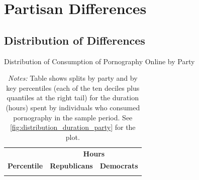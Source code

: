 \documentclass[12pt, letterpaper]{article}
\begin{document}
\section{Partisan Differences}
\subsection{Distribution of Differences}
\begin{table}[ht] \centering \small \setlength\tabcolsep{10 pt}
	\caption{Distribution of Consumption of Pornography Online by Party}
	\label{tab:distribution_duration_party}
	\begin{adjustbox}{max width=\textwidth}
		\begin{tabular}{crr}
			\toprule
			\multicolumn{1}{l}{\textbf{}}&\multicolumn{2}{c}{\textbf{Hours}}\\
			\cmidrule(l){2-3}
			\multicolumn{1}{l}{\textbf{Percentile}}&\multicolumn{1}{c}{\textbf{Republicans}}&\multicolumn{1}{c}{\textbf{Democrats}}\\
			\midrule
			\\
			\bottomrule
		\end{tabular}
	\end{adjustbox}
	\caption*{\footnotesize \emph{Notes:} 
		Table shows splits by party and by key percentiles (each of the ten deciles plus quantiles at the right tail) for the duration (hours) spent by individuals who consumed pornography in the sample period. See \cref{fig:distribution_duration_party} for the plot.
	}
\end{table}
\end{document}
